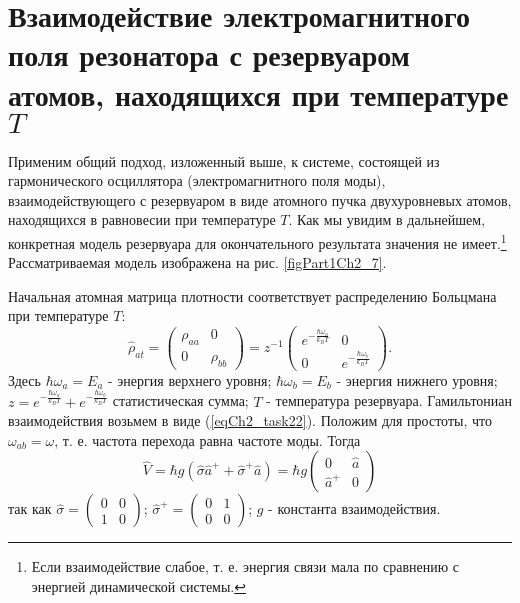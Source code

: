 \section{Взаимодействие электромагнитного поля резонатора
  с резервуаром атомов, находящихся при
  температуре $T$}
\label{ch2_6}
Применим общий подход, изложенный выше, к системе, состоящей из
гармонического осциллятора (электромагнитного поля моды),
взаимодействующего с резервуаром в виде атомного пучка двухуровневых
атомов, находящихся в равновесии при температуре $T$.  Как мы увидим
в дальнейшем, конкретная модель резервуара для окончательного
результата значения не имеет.\footnote{Если взаимодействие слабое,
  т. е. энергия связи мала по сравнению с энергией динамической системы.} 
Рассматриваемая модель изображена на
рис. \ref{figPart1Ch2_7}.  



Начальная атомная матрица плотности соответствует распределению
Больцмана при температуре $T$:  
\begin{equation}
\hat{\rho}_{at} = 
\left(
\begin{array} {cc}
\rho_{aa} & 0  
\\
0 & \rho_{bb} 
\end{array}
\right)
=
z^{-1}
\left(
\begin{array} {cc}
e^{-\frac{\hbar \omega_a}{k_B T}} & 0  
\\
0 & e^{-\frac{\hbar \omega_b}{k_B T}} 
\end{array}
\right).
\end{equation}
Здесь $\hbar \omega_a = E_a$ - энергия верхнего уровня;  
$\hbar \omega_b = E_b$ - энергия нижнего уровня; 
$z = e^{-\frac{\hbar \omega_a}{k_B T}} + e^{-\frac{\hbar \omega_b}{k_B
    T}}$ статистическая сумма; $T$ - температура резервуара. 
Гамильтониан взаимодействия возьмем в виде
(\ref{eqCh2_task22}). Положим для простоты, 
что $\omega_{ab} = \omega$,  т. е. частота перехода равна частоте 
моды. Тогда  
\begin{equation}
\hat{V} = \hbar g \left(\hat{\sigma}\hat{a}^{+} + 
\hat{\sigma}^{+}\hat{a} \right)= 
\hbar g 
\left(
\begin{array} {cc}
0 & \hat{a}  
\\
\hat{a}^{+} & 0 
\end{array}
\right)
\end{equation}
так как  
\(
\hat{\sigma} = 
\left(
\begin{array} {cc}
0 & 0  
\\
1 & 0 
\end{array}
\right)
\);
\(
\hat{\sigma}^{+} = 
\left(
\begin{array} {cc}
0 & 1  
\\
0 & 0 
\end{array}
\right)
\); $g$ - константа взаимодействия. 

